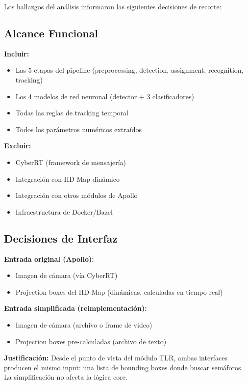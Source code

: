 Los hallazgos del análisis informaron las siguientes decisiones de recorte:

\subsection{Alcance Funcional}

\textbf{Incluir:}
\begin{itemize}
    \item Las 5 etapas del pipeline (preprocessing, detection, assignment, recognition, tracking)
    \item Los 4 modelos de red neuronal (detector + 3 clasificadores)
    \item Todas las reglas de tracking temporal
    \item Todos los parámetros numéricos extraídos
\end{itemize}

\textbf{Excluir:}
\begin{itemize}
    \item CyberRT (framework de mensajería)
    \item Integración con HD-Map dinámico
    \item Integración con otros módulos de Apollo
    \item Infraestructura de Docker/Bazel
\end{itemize}

\subsection{Decisiones de Interfaz}

\textbf{Entrada original (Apollo):}
\begin{itemize}
    \item Imagen de cámara (vía CyberRT)
    \item Projection boxes del HD-Map (dinámicas, calculadas en tiempo real)
\end{itemize}

\textbf{Entrada simplificada (reimplementación):}
\begin{itemize}
    \item Imagen de cámara (archivo o frame de video)
    \item Projection boxes pre-calculadas (archivo de texto)
\end{itemize}

\textbf{Justificación:} Desde el punto de vista del módulo TLR, ambas interfaces producen el mismo input: una lista de bounding boxes donde buscar semáforos. La simplificación no afecta la lógica core.

